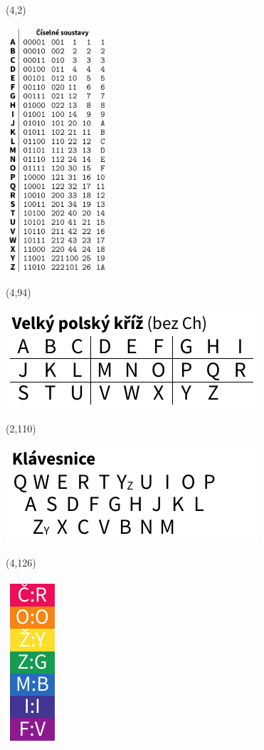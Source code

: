 \documentclass{extarticle}
\begin{document}
\pagecolor{black}
\pagestyle{empty}

\begin{textblock}{38}(4,2)
\vfill
{\centerline{\includegraphics[width=38mm]{tools/numbers-table-v3.pdf}}} 
\vfill
\end{textblock}


\begin{textblock}{38}(4,94)
\vfill
{\centerline{\includegraphics[scale=0.6333]{tools/rosicrucian-polish-v2.pdf}}} 
\vfill
\end{textblock}

\begin{textblock}{38}(2,110)
\vfill
{\centerline{\includegraphics[scale=0.6333]{tools/keyboard-v2.pdf}}} 
\vfill
\end{textblock}

\begin{textblock}{7.6}(4,126)
\vfill
{\centerline{\includegraphics[scale=0.6333]{tools/rainbow-v3.pdf}}} 
\vfill
\end{textblock}
\end{document}
